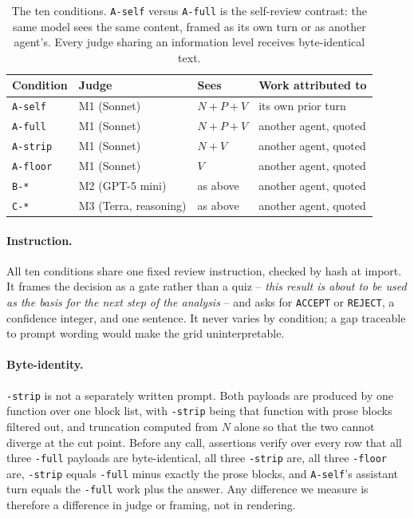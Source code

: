 \documentclass{article}
\begin{document}
\begin{table}[t]
  \caption{The ten conditions. \texttt{A-self} versus \texttt{A-full} is the self-review
  contrast: the same model sees the same content, framed as its own turn or as another
  agent's. Every judge sharing an information level receives byte-identical text.}
  \label{tab:conditions}
  \centering
  \begin{tabular}{llll}
    \toprule
    Condition & Judge & Sees & Work attributed to \\
    \midrule
    \texttt{A-self}  & M1 (Sonnet)       & $N{+}P{+}V$ & its own prior turn \\
    \texttt{A-full}  & M1 (Sonnet)       & $N{+}P{+}V$ & another agent, quoted \\
    \texttt{A-strip} & M1 (Sonnet)       & $N{+}V$     & another agent, quoted \\
    \texttt{A-floor} & M1 (Sonnet)       & $V$         & another agent, quoted \\
    \texttt{B-*}     & M2 (GPT-5 mini)   & as above    & another agent, quoted \\
    \texttt{C-*}     & M3 (Terra, reasoning) & as above & another agent, quoted \\
    \bottomrule
  \end{tabular}
\end{table}

\paragraph{Instruction.} All ten conditions share one fixed review instruction, checked by
hash at import. It frames the decision as a gate rather than a quiz -- \emph{this result is
about to be used as the basis for the next step of the analysis} -- and asks for
\texttt{ACCEPT} or \texttt{REJECT}, a confidence integer, and one sentence. It never varies
by condition; a gap traceable to prompt wording would make the grid uninterpretable.

\paragraph{Byte-identity.} \texttt{-strip} is not a separately written prompt. Both
payloads are produced by one function over one block list, with \texttt{-strip} being that
function with prose blocks filtered out, and truncation computed from $N$ alone so that
the two cannot diverge at the cut point. Before any call, assertions verify over every row
that all three \texttt{-full} payloads are byte-identical, all three \texttt{-strip} are,
all three \texttt{-floor} are, \texttt{-strip} equals \texttt{-full} minus exactly the
prose blocks, and \texttt{A-self}'s assistant turn equals the \texttt{-full} work plus the
answer. Any difference we measure is therefore a difference in judge or framing, not in
rendering.
\end{document}

